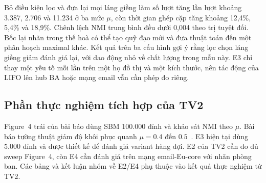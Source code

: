 Bỏ điều kiện lọc và đưa lại mọi láng giềng làm số lượt tăng lần lượt khoảng 3.387, 2.706 và 11.234 ở ba mức $\mu$, còn thời gian ghép cặp tăng khoảng 12,4\%, 5,4\% và 18,9\%. Chênh lệch NMI trung bình đều dưới 0,004 theo trị tuyệt đối. Bốc lại nhãn trong thế hoà có thể tạo quỹ đạo mới và đưa thuật toán đến một phân hoạch maximal khác. Kết quả trên ba cấu hình gợi ý rằng lọc chọn láng giềng giảm đánh giá lại, với dao động nhỏ về chất lượng trong mẫu này. E3 chỉ thay một yếu tố mỗi lần trên một họ đồ thị và một kích thước, nên tác động của LIFO lên hub BA hoặc mạng email vẫn cần phép đo riêng.

\subsection{Phần thực nghiệm tích hợp của TV2}
Figure~4 trái của bài báo dùng SBM 100.000 đỉnh và khảo sát NMI theo $\mu$. Bài báo tường thuật giảm độ khôi phục quanh $\mu=0.4$ đến $0.5$~\cite{flpa}. E3 hiện tại dùng 5.000 đỉnh và được thiết kế để đánh giá variant hàng đợi. E2 của TV2 cần đo đủ sweep Figure~4, còn E4 cần đánh giá trên mạng email-Eu-core với nhãn phòng ban. Các bảng và kết luận nhóm về E2/E4 phụ thuộc vào kết quả thực nghiệm từ TV2.
